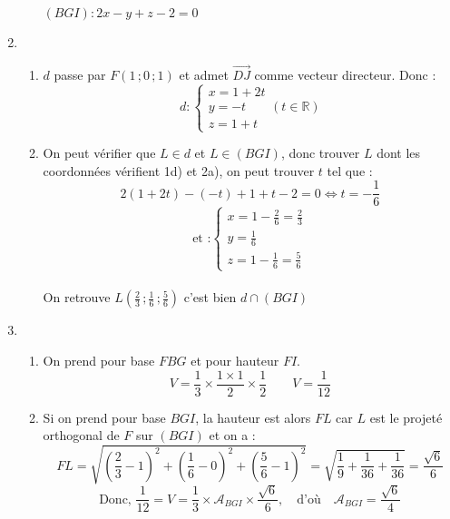 \documentclass{scrartcl}
\begin{document}
\begin{adjustwidth}{2em}{0pt}
\begin{enumerate}
\begin{enumerate}[label=\alph*)]
                $\boxed{(BGI):2x-y+z-2=0}$ 
            \end{enumerate}
            \item \begin{enumerate}[label=\alph*)]
                \item   $d$ passe par $F(1\,;0\,;1)$ et admet $\overrightarrow{DJ}$ comme vecteur directeur. Donc : \[\boxed{d:\begin{cases}
                    x=1+2t \\ y=-t \\ z=1+t
                \end{cases} (t\in{\mathbb{R}})}\]
                \item On peut vérifier que $L\in d$ et $L\in(BGI)$, donc trouver $L$ dont les coordonnées vérifient 1d) et 2a), on peut trouver $t$ tel que : \[2(1+2t)-(-t)+1+t-2=0\iff t=-\frac{1}{6}\]  \[\text{et :}\begin{cases}
                    x=1-\frac{2}{6}=\frac{2}{3} \\ y=\frac{1}{6} \\ z=1-\frac{1}{6}=\frac{5}{6}
                \end{cases}\] \\
                On retrouve $\boxed{L\left(\frac{2}{3}\,;\frac{1}{6}\,;\frac{5}{6}\right)}$ c'est bien $d\cap(BGI)$
            \end{enumerate}
            \item \begin{enumerate}[label=\alph*)]
                \item On prend pour base $FBG$ et pour hauteur $FI$. \[V=\frac{1}{3}\times\frac{1\times 1}{2}\times\frac{1}{2}\qquad\boxed{V=\frac{1}{12}}\]
                \item Si on prend pour base $BGI$, la hauteur est alors $FL$ car $L$ est le projeté orthogonal de $F$ sur $(BGI)$ et on a : \[FL=\sqrt{\left(\frac{2}{3}-1\right)^2+\left(\frac{1}{6}-0\right)^2+\left(\frac{5}{6}-1\right)^2}=\sqrt{\frac{1}{9}+\frac{1}{36}+\frac{1}{36}}=\frac{\sqrt{6}}{6}\] \[\text{Donc, }\frac{1}{12}=V=\frac{1}{3}\times\mathcal{A}_{BGI}\times\frac{\sqrt{6}}{6},\quad\text{d'où}\quad\boxed{\mathcal{A}_{BGI}=\frac{\sqrt{6}}{4}}\]
            \end{enumerate}
        \end{enumerate}
    \end{adjustwidth}
\end{document}
